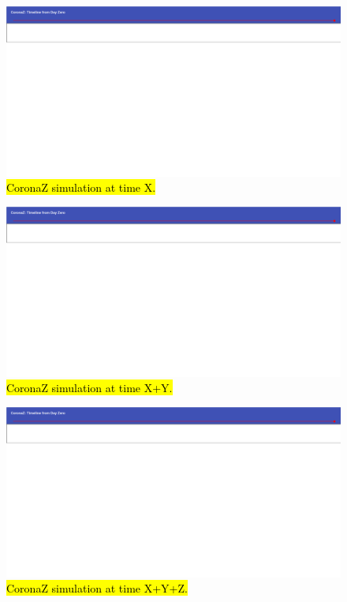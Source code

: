 \documentclass[conference]{IEEEtran}
\begin{document}
	\begin{figure}[htbp]
		\centerline{\includegraphics[width=\linewidth]{img/sim_1.png}}
		\caption{\hl{CoronaZ simulation at time X.}}
		\label{fig:sim_1}
	\end{figure}
	\begin{figure}[htbp]
		\centerline{\includegraphics[width=\linewidth]{img/sim_2.png}}
		\caption{\hl{CoronaZ simulation at time X+Y.}}
		\label{fig:sim_2}
	\end{figure}
	\begin{figure}[htbp]
		\centerline{\includegraphics[width=\linewidth]{img/sim_3.png}}
		\caption{\hl{CoronaZ simulation at time X+Y+Z.}}
		\label{fig:sim_3}
	\end{figure}
\end{document}
